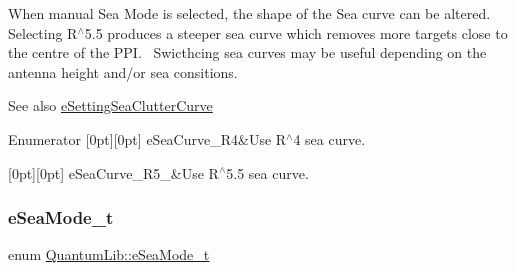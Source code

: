 When manual Sea Mode is selected, the shape of the Sea curve can be altered.~\newline
Selecting R$^\wedge$5.5 produces a steeper sea curve which removes more targets close to the centre of the P\+PI.~\newline
Swicthcing sea curves may be useful depending on the antenna height and/or sea consitions. \begin{DoxySeeAlso}{See also}
\mbox{\hyperlink{namespace_quantum_lib_acc8124e3e65bca4aa798d03a55e3d54caa0386489e8bf5279351a8c77b8a039ab}{e\+Setting\+Sea\+Clutter\+Curve}} 
\end{DoxySeeAlso}
\begin{DoxyEnumFields}{Enumerator}
[0pt][0pt]{}\mbox{\label{namespace_quantum_lib_aeaeea421c9323b85e6b45fa78e3b2a06a462a4673778fa74ce2715e58a1ab56d7}} 
e\+Sea\+Curve\+\_\+\+R4&Use R$^\wedge$4 sea curve. \\
\hline

[0pt][0pt]{}\mbox{\label{namespace_quantum_lib_aeaeea421c9323b85e6b45fa78e3b2a06ab85d01c600b49ab59974c0c47a7ae6ab}} 
e\+Sea\+Curve\+\_\+\+R5\+\_&Use R$^\wedge$5.5 sea curve. \\
\hline

\end{DoxyEnumFields}
\mbox{\label{namespace_quantum_lib_a66c359df4d1d3895303ab24910200c8d}} 
\subsubsection{\texorpdfstring{e\+Sea\+Mode\+\_\+t}{eSeaMode\_t}}
{\footnotesize\ttfamily enum \mbox{\hyperlink{namespace_quantum_lib_a66c359df4d1d3895303ab24910200c8d}{Quantum\+Lib\+::e\+Sea\+Mode\+\_\+t}}}

